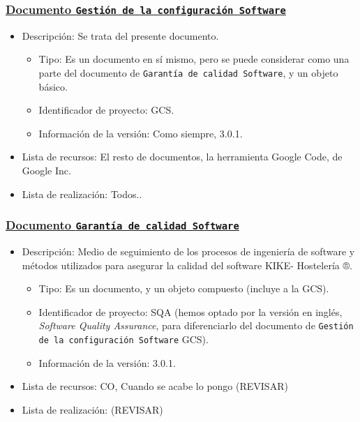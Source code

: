 \documentclass[spanish,a4paper,11pt, twoside]{report}	%
\begin{document}
			\subsubsection{\underline{Documento \texttt{Gestión de la configuración Software}}}
			\begin{itemize}	
				\item{Descripción:} Se trata del presente documento.
					\begin{itemize}	
						\item{Tipo:} Es un documento en sí mismo, pero se puede considerar como una parte del documento de \texttt{Garantía de calidad Software}, y un objeto básico. 
						\item{Identificador de proyecto:} GCS.
						\item{Información de la versión:} Como siempre, 3.0.1.
					\end{itemize}	
				\item{Lista de recursos:} El resto de documentos, la herramienta Google Code, de Google Inc.
				\item{Lista de realización:} Todos..
			\end{itemize}	

			\subsubsection{\underline{Documento \texttt{Garantía de calidad Software}}}
			\begin{itemize}	
				\item{Descripción:} Medio de seguimiento de los procesos de ingeniería de software y métodos utilizados para asegurar la calidad del software KIKE- Hostelería ®.
					\begin{itemize}	
						\item{Tipo:} Es un documento, y un objeto compuesto (incluye a la GCS). 
						\item{Identificador de proyecto:} SQA (hemos optado por la versión en inglés, \textit{Software Quality Assurance}, para diferenciarlo del documento de \texttt{Gestión de la configuración Software} GCS).
						\item{Información de la versión:} 3.0.1.
					\end{itemize}	
				\item{Lista de recursos:} CO, Cuando se acabe lo pongo (REVISAR)
				\item{Lista de realización:} (REVISAR)
			\end{itemize}	
\end{document}
